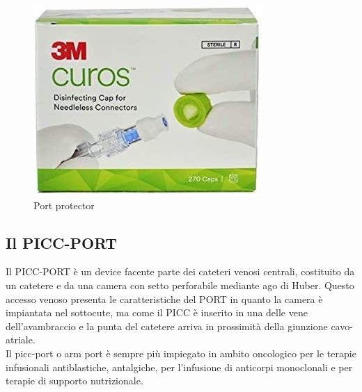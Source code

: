 \begin{figure}[H]
    \begin{center}
    \includegraphics[width=0.5\columnwidth]{img/portprotectors.jpg}
    \end{center}
    \caption[Port protector]{Port protector
    \cite{img47}}

\end{figure}

\subsection{Il PICC-PORT}

Il PICC-PORT è un device facente parte dei cateteri venosi centrali, costituito da un catetere e da una camera con 
setto perforabile mediante ago di Huber. Questo accesso venoso presenta le caratteristiche del PORT in quanto la 
camera è impiantata nel sottocute, ma come il PICC è inserito in una delle vene dell’avambraccio e la punta del 
catetere arriva in prossimità della giunzione cavo-atriale\cite{CRO}.\\
Il picc-port o arm port è sempre più impiegato in ambito oncologico per le terapie infusionali antiblastiche, 
antalgiche, per l’infusione di anticorpi monoclonali e per terapie di supporto nutrizionale\cite{GAVECELTPICCPORT}.\\

